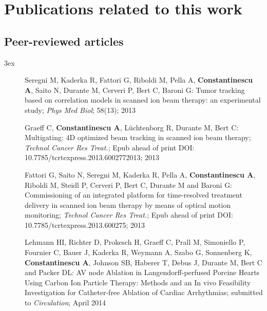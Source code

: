 % 
% 
% 
% 

\newpage
\chapter*{Publications related to this work}


\section*{Peer-reviewed articles}
\begin{setlength}{\leftmargini}{3ex}
  \begin{description}
      \item[] Seregni M, Kaderka R, Fattori G, Riboldi M, Pella A, \textbf{Constantinescu A}, Saito N, Durante M, Cerveri P, Bert C, Baroni G: Tumor tracking based on correlation models in scanned ion beam therapy: an experimental study; \textit{Phys Med Biol}; 58(13); 2013
      \item[] Graeff C, \textbf{Constantinescu A}, L\"uchtenborg R, Durante M, Bert C: Multigating: 4D optimized beam tracking in scanned ion beam therapy; \textit{Technol Cancer Res Treat.}; Epub ahead of print DOI: 10.7785/tcrtexpress.2013.6002772013; 2013
      \item[] Fattori G, Saito N, Seregni M, Kaderka R, Pella A, \textbf{Constantinescu A}, Riboldi M, Steidl P, Cerveri P, Bert C, Durante M and Baroni G: Commissioning of an integrated platform for time-resolved treatment delivery in scanned ion beam therapy by means of optical motion monitoring; \textit{Technol Cancer Res Treat.}; Epub ahead of print DOI: 10.7785/tcrtexpress.2013.600275; 2013
      \item[] Lehmann HI, Richter D, Prokesch H, Graeff C, Prall M, Simoniello P, Fournier C, Bauer J, Kaderka R, Weymann A, Szabo G, Sonnenberg K, \textbf{Constantinescu A}, Johnson SB, Haberer T, Debus J, Durante M, Bert C and Packer DL: AV node Ablation in Langendorff-perfused Porcine Hearts Using Carbon Ion Particle Therapy: Methods and an In vivo Feasibility Investigation for Catheter-free Ablation of Cardiac Arrhythmias; submitted to \textit{Circulation}; April 2014
  \end{description}
\end{setlength}

